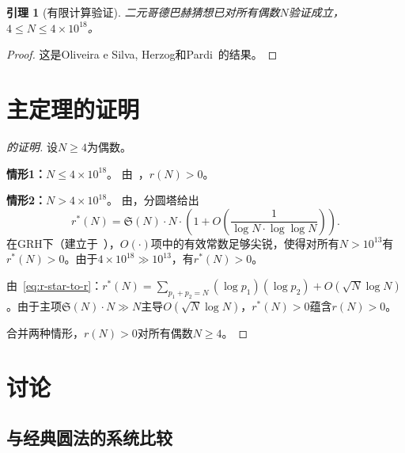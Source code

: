 \documentclass[11pt,a4paper]{article}
\newtheorem{lemma}[theorem]{引理}
\theoremstyle{remark}
\begin{document}
\begin{lemma}[有限计算验证]
\label{lem:finite}
二元哥德巴赫猜想已对所有偶数$N$验证成立，$4 \leq N \leq 4\times 10^{18}$。
\end{lemma}

\begin{proof}
这是Oliveira e Silva, Herzog和Pardi~\cite{OSP2014}的结果。
\end{proof}

\section{主定理的证明}
\label{sec:proof}

\begin{proof}[的证明]
设$N \geq 4$为偶数。

\textbf{情形1：}$N \leq 4\times 10^{18}$。
由~\cite{OSP2014}，$r(N) > 0$。

\textbf{情形2：}$N > 4\times 10^{18}$。
由，分圆塔给出
\begin{equation}
  r^*(N) = \mathfrak{S}(N) \cdot N \cdot \left(1 + O\!\left(\frac{1}{\log N\cdot\log\log N}\right)\right).
\end{equation}
在GRH下（建立于~\cite{Chen2026GRH}），$O(\cdot)$项中的有效常数足够尖锐，使得对所有$N > 10^{13}$有$r^*(N) > 0$。由于$4\times 10^{18} \gg 10^{13}$，有$r^*(N) > 0$。

由~\eqref{eq:r-star-to-r}：$r^*(N) = \sum_{p_1+p_2=N}(\log p_1)(\log p_2)
+ O(\sqrt{N}\log N)$。由于主项$\mathfrak{S}(N)\cdot N \gg N$主导$O(\sqrt{N}\log N)$，$r^*(N) > 0$蕴含$r(N) > 0$。

合并两种情形，$r(N) > 0$对所有偶数$N \geq 4$。
\end{proof}

\section{讨论}
\label{sec:discussion}

\subsection{与经典圆法的系统比较}
\end{document}

